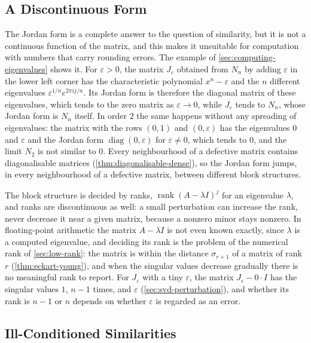 \subsection{A Discontinuous Form}

The Jordan form is a complete answer to the question of similarity, but it is not a continuous function of the matrix, and this makes it unsuitable for computation with numbers that carry rounding errors. The example of \cref{sec:computing-eigenvalues} shows it. For $\varepsilon>0$, the matrix $J_\varepsilon$ obtained from $N_n$ by adding $\varepsilon$ in the lower left corner has the characteristic polynomial $x^n-\varepsilon$ and the $n$ different eigenvalues $\varepsilon^{1/n}e^{2\pi ij/n}$. Its Jordan form is therefore the diagonal matrix of these eigenvalues, which tends to the zero matrix as $\varepsilon\to0$, while $J_\varepsilon$ tends to $N_n$, whose Jordan form is $N_n$ itself. In order $2$ the same happens without any spreading of eigenvalues: the matrix with the rows $(0,1)$ and $(0,\varepsilon)$ has the eigenvalues $0$ and $\varepsilon$ and the Jordan form $\operatorname{diag}(0,\varepsilon)$ for $\varepsilon\ne0$, which tends to $0$, and the limit $N_2$ is not similar to $0$. Every neighbourhood of a defective matrix contains diagonalisable matrices (\cref{thm:diagonalisable-dense}), so the Jordan form jumps, in every neighbourhood of a defective matrix, between different block structures.

The block structure is decided by ranks, $\operatorname{rank}(A-\lambda I)^j$ for an eigenvalue $\lambda$, and ranks are discontinuous as well: a small perturbation can increase the rank, never decrease it near a given matrix, because a nonzero minor stays nonzero. In floating-point arithmetic the matrix $A-\lambda I$ is not even known exactly, since $\lambda$ is a computed eigenvalue, and deciding its rank is the problem of the numerical rank of \cref{sec:low-rank}: the matrix is within the distance $\sigma_{r+1}$ of a matrix of rank $r$ (\cref{thm:eckart-young}), and when the singular values decrease gradually there is no meaningful rank to report. For $J_\varepsilon$ with a tiny $\varepsilon$, the matrix $J_\varepsilon-0\cdot I$ has the singular values $1$, $n-1$ times, and $\varepsilon$ (\cref{sec:svd-perturbation}), and whether its rank is $n-1$ or $n$ depends on whether $\varepsilon$ is regarded as an error.

\subsection{Ill-Conditioned Similarities}

